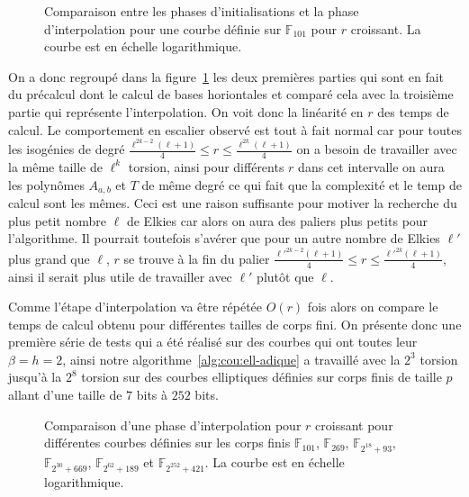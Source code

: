 \documentclass[10pt,a4paper]{book}
\theoremstyle{plain}
\theoremstyle{definition}
\theoremstyle{definition}
\theoremstyle{definition}
\theoremstyle{definition}
\theoremstyle{remark}
\theoremstyle{remark}
\theoremstyle{definition}
\begin{document}
\begin{figure}
\label{fig:exp:uni}
\caption{Comparaison entre les phases d'initialisations et la phase d'interpolation pour une courbe définie sur $\mathbb{F}_{101}$ pour $r$ croissant. La courbe est en échelle logarithmique.}
\end{figure}


On a donc regroupé dans la figure~\ref{fig:exp:uni} les deux premières parties
qui sont en fait du précalcul dont le calcul de bases horiontales et comparé 
cela avec la troisième partie qui représente l'interpolation. On voit donc la 
linéarité en $r$ des temps de calcul. 
Le comportement en escalier observé est tout à fait normal car pour toutes les 
isogénies de degré 
$\frac{\ell^{2k-2}(\ell+1)}{4} \leqslant r \leqslant \frac{\ell^{2k}(\ell+1)}{4}$ 
on a besoin de travailler avec la même taille de $\ell^{k}$ torsion, ainsi pour 
différents $r$ dans cet intervalle on aura les polynômes $A_{a,b}$ et $T$ de 
même degré ce qui fait que la complexité et le temp de calcul sont les mêmes. 
Ceci est une raison 
suffisante pour motiver la recherche du plus petit nombre $\ell$ de Elkies car
alors on aura des paliers plus petits pour l'algorithme. Il pourrait toutefois 
s'avérer que pour un autre nombre de Elkies $\ell'$ plus grand que $\ell$, $r$ 
se trouve à la fin du palier $\frac{\ell'^{2k-2}(\ell+1)}{4} \leqslant r 
\leqslant \frac{\ell'^{2k}(\ell+1)}{4}$, ainsi il serait plus utile de 
travailler avec $\ell'$ plutôt que $\ell$.

Comme l'étape d'interpolation va être répétée $O(r)$ fois alors on compare le 
temps de calcul obtenu pour différentes tailles de corps fini.
On présente donc une première série de tests qui a été réalisé sur des 
courbes qui ont toutes leur $\beta=h=2$, ainsi notre 
algorithme~\ref{alg:cou:ell-adique} a travaillé avec la $2^3$ torsion jusqu'à la 
$2^8$ torsion sur des courbes elliptiques définies sur corps finis de taille 
$p$ allant d'une taille de $7$ bits à $252$ bits.



\begin{figure}
\label{fig:exp:dif}
%
\caption{Comparaison d'une phase d'interpolation pour $r$ croissant pour différentes courbes définies sur les corps finis $\mathbb{F}_{101}$, $\mathbb{F}_{269}$, $\mathbb{F}_{2^{18}+93 }$, $\mathbb{F}_{2^{30}+669}$, $\mathbb{F}_{2^{62}+189}$ et $\mathbb{F}_{2^{252}+421}$. La courbe est en échelle logarithmique.}
\end{figure}
\end{document}
